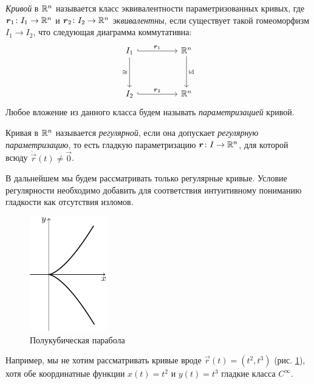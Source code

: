 \begin{definition}
	\textit{Кривой} в $\mathbb{R}^n$ называется класс эквивалентности параметризованных кривых, где $\boldsymbol{r}_1\colon I_1 \to \mathbb{R}^n$ и $\boldsymbol{r}_2\colon I_2 \to \mathbb{R}^n$ \textit{эквивалентны}, если существует такой гомеоморфизм $I_1 \to I_2$, что следующая диаграмма коммутативна:
	\begin{equation*}
		\begin{tikzcd}
			I_1 && {\R^n} \\
			\\
			I_2 && {\R^n}
			\arrow["\vec{r}_1", hook, from=1-1, to=1-3]
			\arrow["\cong"', from=1-1, to=3-1]
			\arrow["\id", from=1-3, to=3-3]
			\arrow["\vec{r}_2", hook, from=3-1, to=3-3]
		\end{tikzcd}
	\end{equation*}
	Любое вложение из данного класса будем называть \textit{параметризацией} кривой.
\end{definition}

\begin{definition}
	Кривая в $\mathbb{R}^n$ называется \textit{регулярной}, если она допускает \textit{регулярную параметризацию}, то есть гладкую параметризацию $\boldsymbol{r}\colon I \to \mathbb{R}^n$, для которой всюду $\dot{\vec{r}}(t) \ne \vec{0}$.
\end{definition}

В дальнейшем мы будем рассматривать только регулярные кривые. Условие регулярности необходимо добавить для соответствия интуитивному пониманию гладкости как отсутствия изломов.
\begin{figure}[h]
	\centering
	\includegraphics[height=5cm]{./img/SemicubicalParabola.pdf}
	\caption{Полукубическая парабола}
	\label{fig:SemicubicalParabola}
\end{figure}
Например, мы не хотим рассматривать кривые вроде $\vec{r}(t) = (t^2, t^3)$ (рис. \ref{fig:SemicubicalParabola}), хотя обе координатные функции $x(t) = t^2$ и $y(t) = t^3$ гладкие класса $C^\infty$.

